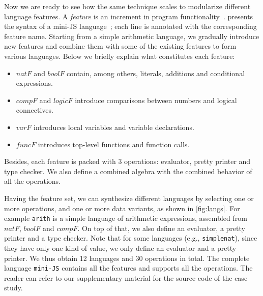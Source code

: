 Now we are ready to see how the same technique scales to modularize different
language features. A \emph{feature} is an increment in program
functionality~\citep{zave1999faq,lopez2005evaluating}. 
presents the syntax of a mini-JS language~\citep{poplcook}; each line is
annotated with the corresponding feature name. Starting from a simple arithmetic
language, we gradually introduce new features and combine them with some of the
existing features to form various languages. Below we briefly explain what
constitutes each feature:
\begin{itemize}
\item $\mathit{natF}$ and $\mathit{boolF}$ contain, among others, literals, additions and conditional expressions.
\item $\mathit{compF}$ and $\mathit{logicF}$ introduce comparisons between numbers and logical connectives.
\item $\mathit{varF}$ introduces local variables and variable declarations.
\item $\mathit{funcF}$ introduces top-level functions and function calls.
\end{itemize}
Besides, each feature is packed with 3 operations: evaluator, pretty
printer and type checker. We also define a combined algebra with the combined behavior of all the operations.

Having the feature set, we can synthesize different languages by selecting one
or more operations, and one or more data variants, as shown in \cref{fig:langs}.
For example \lstinline{arith} is a simple language of arithmetic expressions,
assembled from $\mathit{natF}$, $\mathit{boolF}$ and $\mathit{compF}$. On top of
that, we also define an evaluator, a pretty printer and a type checker. Note
that for some languages (e.g., \lstinline{simplenat}), since they have only one
kind of value, we only define an evaluator and a pretty printer. We thus obtain
12 languages and 30 operations in total. The complete language
\lstinline{mini-JS} contains all the features and supports all the operations.
The reader can refer to our supplementary material for the source code of the case study.


